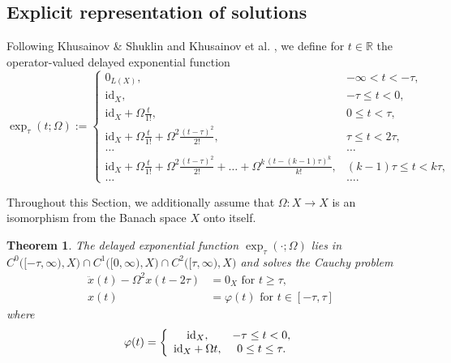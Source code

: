\documentclass[12pt]{article}
\newtheorem{theorem}{Theorem}[section]
\numberwithin{equation}{section}
\numberwithin{equation}{section}
\begin{document}
	\subsection{Explicit representation of solutions}
	\label{SECTION_HARMONIC_OSCILLATOR_WITH_DELAY_SOLUTION_REPRESENTATION} 
	Following Khusainov \& Shuklin \cite{KhuShu2005} and Khusainov et al. \cite{KhuPoRa2013}, 
	we define for $t \in \mathbb{R}$ the operator-valued delayed exponential function
	\begin{equation}
		\exp_{\tau}(t; \Omega) :=
		\left\{
		\begin{array}{cc}
			0_{L(X)}, & -\infty < t < -\tau, \\
			\mathrm{id}_{X}, & -\tau \leq t < 0, \\
			\mathrm{id}_{X} + \Omega \frac{t}{1!}, & 0 \leq t < \tau, \\
			\mathrm{id}_{X} + \Omega \frac{t}{1!} + \Omega^{2} \frac{(t - \tau)^{2}}{2!}, & \tau \leq t < 2\tau, \\
			\dots & \dots \\
			\mathrm{id}_{X} + \Omega \frac{t}{1!} + \Omega^{2} \frac{(t - \tau)^{2}}{2!} + \dots +
			\Omega^{k} \frac{\left(t - (k - 1) \tau\right)^{k}}{k!}, & (k - 1) \tau \leq t < k\tau, \\
			\dots & \dots.
		\end{array}
		\right.
		\label{EQUATION_DEFINITION_OF_DELAYED_EXPONENTIAL}
	\end{equation}

	Throughout this Section, we additionally assume that
	$\Omega \colon X \to X$ is an isomorphism from the Banach space $X$ onto itself.
	\begin{theorem}
		The delayed exponential function $\exp_{\tau}(\cdot; \Omega)$ lies in 
		$C^{0}\big([-\tau, \infty), X\big) \cap C^{1}\big([0, \infty), X\big) \cap C^{2}\big([\tau, \infty), X\big)$
		and solves the Cauchy problem
		\begin{align}
			\ddot{x}(t) - \Omega^{2} x(t - 2\tau) &= 0_{X} \text{ for } t \geq \tau, \label{EQUATION_DDE_FOR_DEXP_1} \\
			x(t) &= \varphi(t) \text{ for } t \in [-\tau, \tau] \label{EQUATION_DDE_FOR_DEXP_2}
		\end{align}
		where
		\begin{equation}
			\varphi(t) = \left\{
			\begin{array}{cc}
				\mathrm{id}_{X}, & -\tau \leq t < 0, \\
				\mathrm{id}_{X} + \Omega t, & 0 \leq t \leq \tau. 
			\end{array}
			\right. \notag
		\end{equation}
	\end{theorem}
\end{document}
